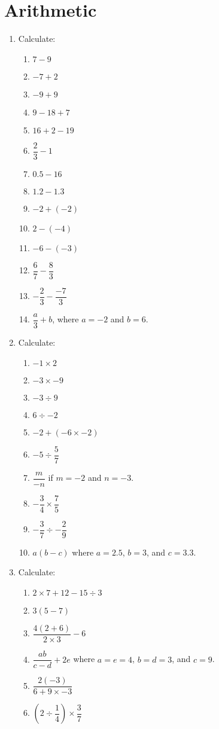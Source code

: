 \documentclass{amsbook}
\begin{document}
\section{Arithmetic}
\begin{enumerate}
  \item Calculate:
    \begin{enumerate}
      \item $ 7 - 9 $
      \item $ -7 + 2 $
      \item $ -9 + 9 $
      \item $ 9 - 18 + 7 $
      \item $ 16 + 2 - 19 $
      \item $ \dfrac{2}{3} - 1 $
      \item $ 0.5 - 16 $
      \item $ 1.2 - 1.3 $
      \item $ -2 + (-2) $
      \item $ 2 - (-4) $
      \item $ -6 - (-3) $
      \item $ \dfrac{6}{7} - \dfrac{8}{3} $
      \item $ -\dfrac{2}{3} - \dfrac{-7}{3} $
      \item $ \dfrac{a}{3} + b $, where $ a = - 2 $ and $ b = 6 $.
    \end{enumerate}
  \item Calculate:
    \begin{enumerate}
      \item $ -1 \times 2 $
      \item $ -3 \times -9 $
      \item $ -3 \div 9 $
      \item $ 6 \div -2 $
      \item $ -2 + (-6 \times -2) $
      \item $ -5 \div \dfrac{5}{7} $
      \item $ \dfrac{m}{-n} $ if $ m = -2 $ and $ n = -3 $.
      \item $ -\dfrac{3}{4} \times \dfrac{7}{5} $
      \item $ -\dfrac{3}{7} \div -\dfrac{2}{9} $
      \item $ a(b - c) $ where $ a = 2.5 $, $ b = 3 $, and $ c = 3.3 $.
    \end{enumerate}
  \item Calculate:
    \begin{enumerate}
      \item $ 2 \times 7 + 12 - 15 \div 3 $
      \item $ 3(5 - 7) $
      \item $ \dfrac{4(2 + 6)}{2 \times 3} - 6 $
      \item $ \dfrac{ab}{c - d} + 2e $ where $ a = e = 4 $, $ b = d = 3 $, and $ c = 9 $.
      \item $ \dfrac{2(-3)}{6 + 9 \times -3} $
      \item $ \left(2 \div \dfrac{1}{4} \right) \times \dfrac{3}{7} $
    \end{enumerate}
\end{enumerate}
\end{document}
